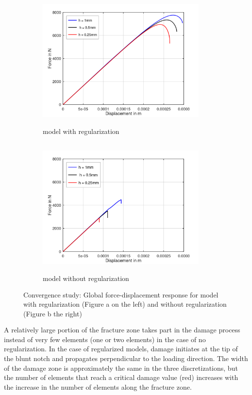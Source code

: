 \documentclass[12pt,a4paper,twoside,openright]{report}
\begin{document}
\begin{figure}[htbp!]
       \begin{subfigure}{0.45\textwidth}
         \includegraphics[width=8.5cm,height=7cm]{25.FvsD.png}
         \caption{model with regularization}
         \label{fig:with regularization}
     \end{subfigure}
     \hspace{1.3cm}
     \begin{subfigure}{0.45\textwidth}
         \includegraphics[width=8.5cm,height=7cm]{25.FvsD2.png}
         \caption{model without regularization}
         \label{fig:without regularization}
     \end{subfigure}
    \caption{Convergence study: Global force-displacement response for model with regularization (Figure a on the left) and without regularization (Figure b the right) }
    \label{fig:Convergence study}
\end{figure}
\FloatBarrier
 
\indent\indent\indent   A relatively large portion of the fracture zone takes part in the damage process instead of very few elements (one or two elements) in the case of no regularization. In the case of regularized models, damage initiates at the tip of the blunt notch and propagates perpendicular to the loading direction. The width of the damage zone is approximately the same in the three discretizations, but the number of elements that reach a critical damage value (red) increases with the increase in the number of elements along the fracture zone.
\end{document}
